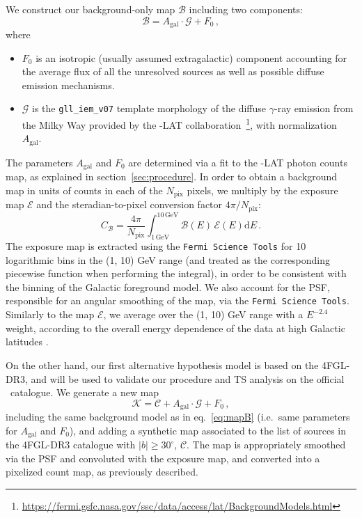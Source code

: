 We construct our background-only map $\mathcal{B}$ including two components:
\begin{equation}
    \mathcal{B} =  A_\textrm{gal}\cdot\mathcal{G} + F_{0}\,,
    \label{eq:mapB}
\end{equation}
where 
\begin{itemize}
    \item $F_{0}$ is an isotropic (usually assumed extragalactic) component accounting for the average flux of all the unresolved  sources as well as possible diffuse emission mechanisms. 
    \item $\mathcal{G}$ is  the \verb|gll_iem_v07| template morphology of the diffuse $\gamma$-ray emission from the Milky Way provided by the \Fermi-LAT collaboration~\footnote{\href{https://fermi.gsfc.nasa.gov/ssc/data/access/lat/BackgroundModels.html}{https://fermi.gsfc.nasa.gov/ssc/data/access/lat/BackgroundModels.html}}, with normalization $A_\textrm{gal}$.      
\end{itemize}
The parameters $A_\textrm{gal}$ and $F_0$ are determined via a fit to the \Fermi-LAT photon counts map, as explained in section~\ref{sec:procedure}. In order to obtain a background map in units of counts in each of the $N_\textrm{pix}$ pixels, we multiply by the exposure map $\mathcal{E}$ and the steradian-to-pixel conversion factor $4\pi / N_\textrm{pix}$:
\begin{equation}
    C_\mathcal{B} = \frac{4\pi}{N_\textrm{pix}} \int_{1 \, \textrm{GeV}}^{10 \, \textrm{GeV}} \mathcal{B}(E)\, \mathcal{E}(E)\textrm{d}E \,.
\end{equation}
The exposure map is extracted using the \texttt{Fermi Science Tools} for 10 logarithmic bins in the (1, 10) GeV range (and treated as the corresponding piecewise function when performing the integral), in order to be consistent with the binning of the Galactic foreground model.
%
We also account for the PSF, responsible for an angular smoothing of the map,  via the \texttt{Fermi Science Tools}. 
Similarly to the map $\mathcal{E}$, we average over the (1, 10) GeV range  with a $E^{-2.4}$ weight, according to the overall energy dependence of the data  at high Galactic latitudes \cite{Fornasa:2016ohl}. 



\medskip 
On the other hand, our first alternative hypothesis model is based on the 4FGL-DR3, and will be used to validate our procedure and TS analysis on the official \Fermi~catalogue. 
%
We generate a new map 
\begin{equation}
    \mathcal{K} = \mathcal{C}+ A_\textrm{gal}\cdot\mathcal{G} + F_{0}\,,
    \label{eq:mapK}
\end{equation}
including the same background model as in eq.~\eqref{eq:mapB} (i.e.~same parameters for $A_\textrm{gal}$ and $F_0$), and adding a synthetic map associated to the list of sources in the 4FGL-DR3 catalogue with $|b|\geq 30^\circ$, $\mathcal{C}$. The map is appropriately smoothed via the PSF and convoluted with the exposure map, and converted into a pixelized count map, as previously described. 

